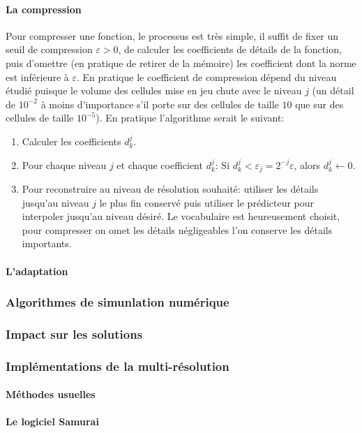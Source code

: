     \paragraph{La compression}
            Pour compresser une fonction, le processus est très simple, il suffit de fixer un seuil de compression $\varepsilon > 0$,
            de calculer les coefficients de détails de la fonction, 
            puis d'omettre (en pratique de retirer de la mémoire) les coefficient dont la norme est inférieure à $\varepsilon$.
            En pratique le coefficient de compression dépend du niveau étudié puisque le volume des cellules mise en jeu chute avec le niveau $j$
            (un détail de $10^{-2}$ à moins d'importance s'il porte sur des cellules de taille $10$ que sur des cellules de taille $10^{-5}$).
            En pratique l'algorithme serait le suivant:
            \begin{enumerate}
                \item Calculer les coefficients $d_k^j$.
                \item Pour chaque niveau $j$ et chaque coefficient $d_k^j$: Si $d_k^j < \varepsilon_j = 2^{-j}\varepsilon$, alors $d_k^j\leftarrow 0$.
                \item[] Pour reconstruire au niveau de résolution souhaité: utiliser les détails jusqu'au niveau $j$ le plus fin conservé puis utiliser le prédicteur 
                pour interpoler jusqu'au niveau désiré. Le vocabulaire est heureusement choisit, pour compresser on omet les détails négligeables l'on conserve les détails importants.
            \end{enumerate}
    \paragraph{L'adaptation}
\subsubsection{Algorithmes de simunlation numérique}
    \paragraph{}
    \paragraph{}
\subsubsection{Impact sur les solutions}
    \paragraph{}
    \paragraph{}
\subsubsection{Implémentations de la multi-résolution}
    \paragraph{Méthodes usuelles}
    \paragraph{Le logiciel Samurai}